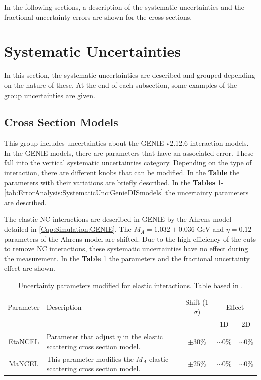 In the following sections, a description of the systematic uncertainties and the fractional uncertainty errors are shown for the cross sections.

\section{Systematic Uncertainties}
\label{Cap:ErrorAnalysis:SystematicUnc}

In this section, the systematic uncertainties are described and grouped depending on the nature of these. At the end of each subsection, some examples of the group uncertainties are given.

\subsection{Cross Section Models}
\label{Cap:ErrorAnalysis:SystematicUnc:GenieIntMod}
This group includes uncertainties about the GENIE v2.12.6 interaction models. In the GENIE models, there are parameters that have an associated error. These fall into the vertical systematic uncertainties category. Depending on the type of interaction, there are different knobs that can be modified. In the \textbf{Table} the parameters with their variations are briefly described. In the \textbf{Tables} \ref{tab:ErrorAnalysis:SystematicUnc:GenieElastic}-\ref{tab:ErrorAnalysis:SystematicUnc:GenieDISmodels} the uncertainty parameters are described. 

The elastic NC interactions are described in GENIE by the Ahrens model \cite{Ahrens:PhysRevD.35.785} detailed in \ref{Cap:Simulation:GENIE}. The $M_A=1.032\pm0.036$ GeV and $\eta=0.12$ parameters of the Ahrens model are shifted. Due to the high efficiency of the cuts to remove NC interactions, these systematic uncertainties have no effect during the measurement. In the \textbf{Table} \ref{tab:ErrorAnalysis:SystematicUnc:GenieElastic} the parameters and the fractional uncertainty effect are shown. 

\begin{table}[!htb]
    \centering
    \begin{tabular}{c|p{2.5in}|c|c|c}
        \hline
        Parameter & Description  & Shift (1 $\sigma$) & \multicolumn{2}{c}{Effect} \\
         & & & 1D & 2D \\
        \hline 
        EtaNCEL & Parameter that adjust $\eta$ in the elastic scattering  cross section model. & $\pm30\%$ & $\sim0\%$ & $\sim0\%$ \\ \hline
        MaNCEL & This parameter modifies the $M_A$ elastic scattering cross section model. & $\pm25\%$ & $\sim0\%$ & $\sim0\%$ \\ \hline
    \end{tabular}
    \caption{Uncertainty parameters modified for elastic interactions. Table based in \cite{GENIEUnc}.}
    \label{tab:ErrorAnalysis:SystematicUnc:GenieElastic}
\end{table}

